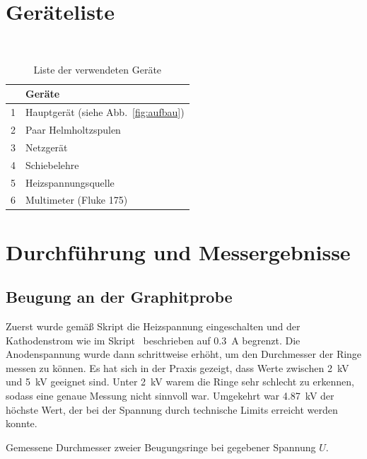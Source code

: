 \documentclass{article}
\begin{document}
\section{Geräteliste}


\begin{table}[H]
\caption{Liste der verwendeten Geräte}
~
\begin{tabular}{l|l}
 & Geräte  \\
\hline
1 & Hauptgerät (siehe Abb.~\ref{fig:aufbau})\\
2 & Paar Helmholtzspulen\\	
3 & Netzgerät\\
4 & Schiebelehre \\
5 & Heizspannungsquelle \\
6 & Multimeter (Fluke 175)
\end{tabular}

\end{table}


\section{Durchführung und Messergebnisse}

\subsection{Beugung an der Graphitprobe}

Zuerst wurde gemäß Skript die Heizspannung eingeschalten und der Kathodenstrom wie im Skript~\cite{moodle} beschrieben auf 0.3~A begrenzt. Die Anodenspannung wurde dann schrittweise erhöht, um den Durchmesser der Ringe messen zu können. Es hat sich in der Praxis gezeigt, dass Werte zwischen 2~kV und 5~kV geeignet sind. Unter 2~kV warem die Ringe sehr schlecht zu erkennen, sodass eine genaue Messung nicht sinnvoll war. Umgekehrt war 4.87~kV der höchste Wert, der bei der Spannung durch technische Limits erreicht werden konnte.


\begin{table}[H]
\caption{Gemessene Durchmesser zweier Beugungsringe bei gegebener Spannung $U$.}
\label{tab:exp1}

\end{table}



%
\end{document}
